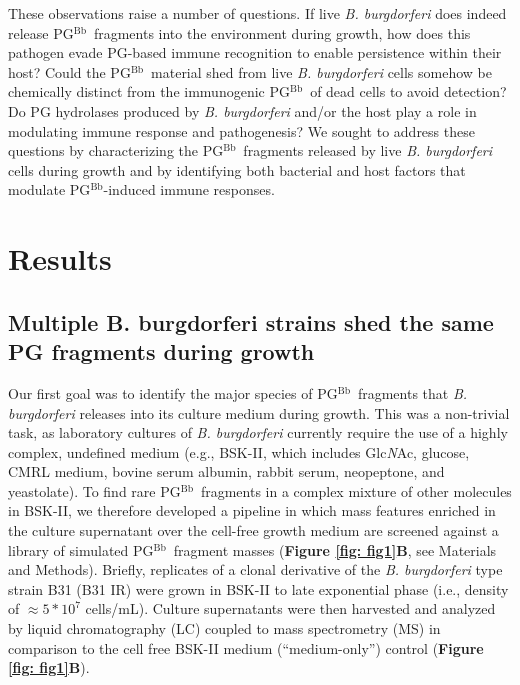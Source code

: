 \documentclass[twoside, watermark]{zHenriquesLab-StyleBioRxiv}
\newcommand{\pgbb}{PG$^\text{Bb}$}
\newcommand{\NAG}{Glc\textit{N}Ac}
\begin{document}
\vspace{1mm}
These observations raise a number of questions. If live \textit{B. burgdorferi} does indeed release \pgbb~fragments into the environment during growth, how does this pathogen evade PG-based immune recognition to enable persistence within their host? Could the \pgbb~material shed from live \textit{B. burgdorferi} cells somehow be chemically distinct from the immunogenic \pgbb~of dead cells to avoid detection? Do PG hydrolases produced by \textit{B. burgdorferi} and/or the host play a role in modulating immune response and pathogenesis? We sought to address these questions by characterizing the \pgbb~fragments released by live \textit{B. burgdorferi} cells during growth and by identifying both bacterial and host factors that modulate \pgbb-induced immune responses. 


\section*{Results}
\subsection*{Multiple B. burgdorferi strains shed the same PG fragments during growth}
Our first goal was to identify the major species of \pgbb~fragments that \textit{B. burgdorferi} releases into its culture medium during growth. This was a non-trivial task, as laboratory cultures of \textit{B. burgdorferi} currently require the use of a highly complex, undefined medium (e.g., BSK-II, which includes \NAG, glucose, CMRL medium, bovine serum albumin, rabbit serum, neopeptone, and yeastolate). To find rare \pgbb~fragments in a complex mixture of other molecules in BSK-II, we therefore developed a pipeline in which mass features enriched in the culture supernatant over the cell-free growth medium are screened against a library of simulated \pgbb~fragment masses (\textbf{Figure \ref{fig: fig1}B}, see Materials and Methods). Briefly, replicates of a clonal derivative of the \textit{B. burgdorferi} type strain B31 (B31 IR) were grown in BSK-II to late exponential phase (i.e., density of $\approx 5 * 10^7$ cells/mL). Culture supernatants were then harvested and analyzed by liquid chromatography (LC) coupled to mass spectrometry (MS) in comparison to the cell free BSK-II medium (“medium-only”) control (\textbf{Figure \ref{fig: fig1}B}).
\end{document}
